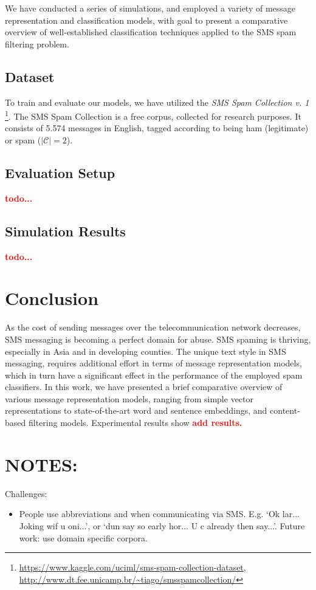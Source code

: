 \documentclass[letterpaper]{article}
\newcommand{\note}[1]{\textbf{\textcolor{red}{#1}}}
\begin{document}
We have conducted a series of simulations, and employed a variety of message representation and classification models, with goal to present a comparative overview of well-established classification techniques applied to the SMS spam filtering problem.

\subsection{Dataset}  \label{Dataset}

To train and evaluate our models, we have utilized the \emph{SMS Spam Collection v. 1} \footnote{\url{https://www.kaggle.com/uciml/sms-spam-collection-dataset}, \\ \url{http://www.dt.fee.unicamp.br/~tiago/smsspamcollection/}}. The SMS Spam Collection is a free corpus, collected for research purposes. It consists of 5.574 messages in English, tagged according to being ham (legitimate) or spam ($|\mathcal{C}| = 2$).

\subsection{Evaluation Setup}  \label{Evaluation Setup}

\note{todo...}

\subsection{Simulation Results}  \label{Simulation Results}

\note{todo...}

\section{Conclusion} \label{Conclusion}

As the cost of sending messages over the telecommunication network decreases, SMS messaging is becoming a perfect domain for abuse. SMS spaming is thriving, especially in Asia and in developing counties. The unique text style in SMS messaging, requires additional effort in terms of message representation models, which in turn have a significant effect in the performance of the employed spam classifiers. In this work, we have presented a brief comparative overview of various message representation models, ranging from simple vector representations to state-of-the-art word and sentence embeddings, and content-based filtering models. Experimental results show \note{add results.}

\section{NOTES:} \label{notes}

Challenges:
\begin{itemize}
	\item People use abbreviations and  when communicating via SMS. E.g. `Ok lar... Joking wif u oni...', or `dun say so early hor... U c already then say...'. Future work: use domain specific corpora.
\end{itemize}

% 
% 


\end{document}
